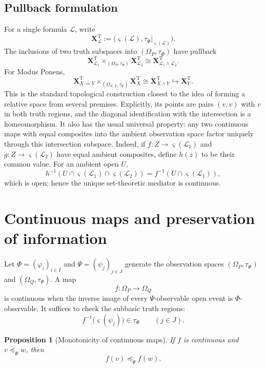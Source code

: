 \documentclass[11pt]{article}
\theoremstyle{definition}
\theoremstyle{plain}
\newtheorem{proposition}[definition]{Proposition}
\theoremstyle{remark}
\newcommand{\True}{\mathrm{T}}
\newcommand{\restr}{\mathord{|}}
\begin{document}
\FloatBarrier
\subsection{Pullback formulation}

For a single formula $\mathcal L$, write
\[
 \mathbf X^\True_{\mathcal L}
 :=\bigl(\varsigma(\mathcal L),
          \tau_\Phi\restr_{\varsigma(\mathcal L)}\bigr).
\]
The inclusions of two truth subspaces into $(\Omega_P,\tau_\Phi)$ have pullback
\[
 \mathbf X^\True_{\mathcal L_1}
 \times_{(\Omega_P,\tau_\Phi)}
 \mathbf X^\True_{\mathcal L_2}
 \cong
 \mathbf X^\True_{\mathcal L_1\wedge\mathcal L_2}.
\]
For Modus Ponens,
\[
 \mathbf X^\True_{X\Rightarrow Y}
 \times_{(\Omega_{X,Y},\tau_\Phi)}
 \mathbf X^\True_X
 \cong
 \mathbf X^\True_{X\wedge Y}
 \hookrightarrow
 \mathbf X^\True_Y.
\]
This is the standard topological construction closest to the idea of forming
a relative space from several premises.  Explicitly, its points are pairs
$(v,v)$ with $v$ in both truth regions, and the diagonal identification with the
intersection is a homeomorphism.  It also has the usual universal property:
any two continuous maps with equal composites into the ambient observation
space factor uniquely through this intersection subspace.  Indeed, if
$f:Z\to\varsigma(\mathcal L_1)$ and
$g:Z\to\varsigma(\mathcal L_2)$ have equal ambient composites, define $h(z)$
to be their common value.  For an ambient open $U$,
\[
 h^{-1}\!\left(U\cap\varsigma(\mathcal L_1)\cap
 \varsigma(\mathcal L_2)\right)
 =f^{-1}\!\left(U\cap\varsigma(\mathcal L_1)\right),
\]
which is open; hence the unique set-theoretic mediator is continuous.

\section{Continuous maps and preservation of information}

Let $\Phi=(\varphi_i)_{i\in I}$ and $\Psi=(\psi_j)_{j\in J}$ generate the
observation spaces $(\Omega_P,\tau_\Phi)$ and $(\Omega_Q,\tau_\Psi)$.  A map
\[
 f:\Omega_P\longrightarrow\Omega_Q
\]
is continuous when the inverse image of every $\Psi$-observable open event is
$\Phi$-observable.  It suffices to check the subbasic truth regions:
\[
 f^{-1}\bigl(\varsigma(\psi_j)\bigr)\in\tau_\Phi
 \qquad(j\in J).
\]

\begin{proposition}[Monotonicity of continuous maps]
If $f$ is continuous and $v\preceq_\Phi w$, then
\[
 f(v)\preceq_\Psi f(w).
\]
\end{proposition}
\end{document}

